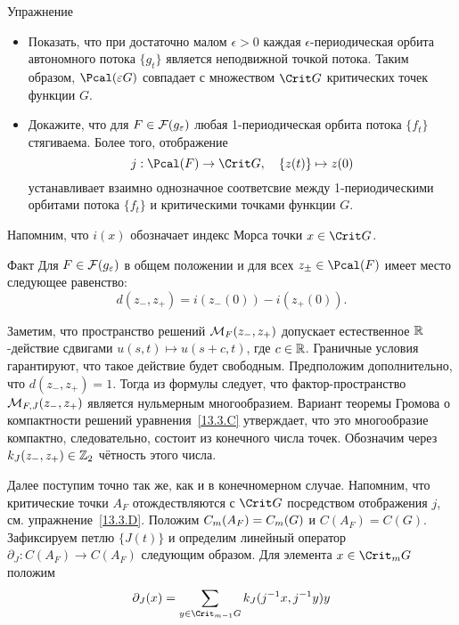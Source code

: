 \begin{ex}{Упражнение}\label{13.3.D}
  \begin{itemize}
  \item
    Показать, что при достаточно малом $\epsilon > 0$ каждая
    $\epsilon$-пе\-ри\-оди\-чес\-кая орбита автономного потока $\{g_{t}\}$
    является неподвижной точкой потока. Таким образом, $\Pcal(\epsilon
    G)$ совпадает с множеством $\Crit G$ критических точек функции $G$.
  \item
    Докажите, что для $F\in\mathcal{F}(g_{\varepsilon})$ любая 1-периодическая
    орбита потока $\{f_{t}\}$ стягиваема. 
    Более того, отображение
    \[
    j : \Pcal(F)\to\Crit G,
    \quad
    \{z(t)\}\mapsto z(0)
    \]
    устанавливает взаимно однозначное соответсвие между
    1-пе\-ри\-оди\-чес\-кими орбитами потока $\{f_{t}\}$ и критическими
    точками функции $G$.
  \end{itemize}
\end{ex}

\pagebreak%

Напомним, что $i(x)$ обозначает индекс Морса точки $x\in\Crit G$.

\begin{thm}{Факт}\label{13.3.E}
  Для $F\in\mathcal{F}(g_{\varepsilon})$ в общем положении и для всех
  $z_{\pm}\in\Pcal(F)$ имеет место следующее равенство:
  \[
  d(z_{-}, z_{+}) = i(z_{-}(0)) - i(z_{+}(0)).
  \]
\end{thm}

Заметим, что пространство решений $\mathcal{M}_{F}(z_{-},z_{+})$ допускает
естественное $\mathbb{R}$-действие сдвигами $u(s, t)\mapsto u(s+c, t)$, где
$c\in\mathbb{R}$.
Граничные условия гарантируют, что такое действие будет свободным.
Предположим дополнительно, что $d(z_{-}, z_{+}) = 1$.
Тогда из формулы  следует, что
фактор-пространство $\mathcal{M}_{F,J}(z_{-},z_{+})$ является нульмерным
многообразием.
Вариант теоремы Громова о компактности решений
уравнения~\ref{13.3.C} утверждает, что это многообразие компактно,
следовательно, состоит из конечного числа точек.
Обозначим через $k_{J}(z_{-},z_{+})\in\mathbb{Z}_{2}$ чётность этого числа.

Далее поступим точно так же, как и в конечномерном случае.
Напомним, что критические точки $A_{F}$ отождествляются с $\Crit G$ посредством отображения $j$, см. упражнение~\ref{13.3.D}.
Положим $C_{m}(A_{F}) \z= C_{m}(G)$ и $C(A_{F}) = C(G)$.
Зафиксируем петлю $\{J(t)\}$ и определим линейный оператор
$\partial_{J}:C(A_{F})\to C(A_{F})$ следующим образом.
Для элемента $x\in\Crit_{m} G$ положим
\[
\partial_{J}(x)=\sum_{y\in\Crit_{m-1}G}k_{J}(j^{-1}x,j^{-1}y)y
\]


